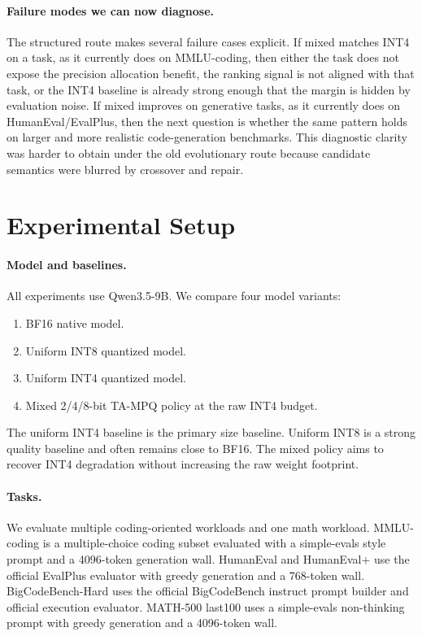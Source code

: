 \documentclass{article}
\newcommand{\method}{TA-MPQ}
\begin{document}
\paragraph{Failure modes we can now diagnose.}
The structured route makes several failure cases explicit. If mixed matches INT4 on a task, as it currently does on MMLU-coding, then either the task does not expose the precision allocation benefit, the ranking signal is not aligned with that task, or the INT4 baseline is already strong enough that the margin is hidden by evaluation noise. If mixed improves on generative tasks, as it currently does on HumanEval/EvalPlus, then the next question is whether the same pattern holds on larger and more realistic code-generation benchmarks. This diagnostic clarity was harder to obtain under the old evolutionary route because candidate semantics were blurred by crossover and repair.

\section{Experimental Setup}

\paragraph{Model and baselines.}
All experiments use Qwen3.5-9B. We compare four model variants:
\begin{enumerate}
    \item BF16 native model.
    \item Uniform INT8 quantized model.
    \item Uniform INT4 quantized model.
    \item Mixed 2/4/8-bit \method{} policy at the raw INT4 budget.
\end{enumerate}
The uniform INT4 baseline is the primary size baseline. Uniform INT8 is a strong quality baseline and often remains close to BF16. The mixed policy aims to recover INT4 degradation without increasing the raw weight footprint.

\paragraph{Tasks.}
We evaluate multiple coding-oriented workloads and one math workload. MMLU-coding is a multiple-choice coding subset evaluated with a simple-evals style prompt and a 4096-token generation wall. HumanEval and HumanEval+ use the official EvalPlus evaluator with greedy generation and a 768-token wall. BigCodeBench-Hard uses the official BigCodeBench instruct prompt builder and official execution evaluator. MATH-500 last100 uses a simple-evals non-thinking prompt with greedy generation and a 4096-token wall.
\end{document}
